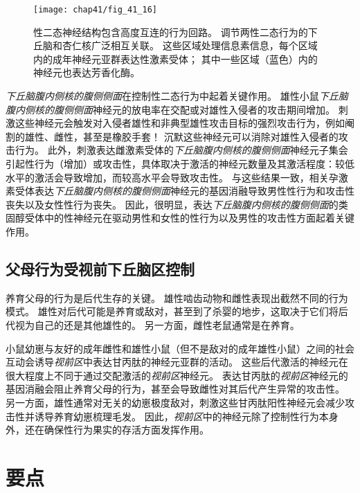 \begin{figure}[htbp]
	\centering
	\texttt{[image: chap41/fig\_41\_16]}
	\caption{性二态神经结构包含高度互连的行为回路。
		调节两性二态行为的下丘脑和杏仁核广泛相互关联。
		这些区域处理信息素信息，每个区域内的成年神经元亚群表达性激素受体；
		其中一些区域（蓝色）内的神经元也表达芳香化酶。}
	\label{fig:41_16}
\end{figure}


\textit{下丘脑腹内侧核的腹侧侧面}在控制性二态行为中起着关键作用。
雄性小鼠\textit{下丘脑腹内侧核的腹侧侧面}神经元的放电率在交配或对雄性入侵者的攻击期间增加。
刺激这些神经元会触发对入侵者雄性和非典型雄性攻击目标的强烈攻击行为，例如阉割的雄性、雌性，甚至是橡胶手套！
沉默这些神经元可以消除对雄性入侵者的攻击行为。
此外，刺激表达雌激素受体的\textit{下丘脑腹内侧核的腹侧侧面}神经元子集会引起性行为（增加）或攻击性，具体取决于激活的神经元数量及其激活程度：较低水平的激活会导致增加，而较高水平会导致攻击性。
与这些结果一致，相关孕激素受体表达\textit{下丘脑腹内侧核的腹侧侧面}神经元的基因消融导致男性性行为和攻击性丧失以及女性性行为丧失。
因此，很明显，表达\textit{下丘脑腹内侧核的腹侧侧面}的类固醇受体中的性神经元在驱动男性和女性的性行为以及男性的攻击性方面起着关键作用。



\subsection{父母行为受视前下丘脑区控制}

养育父母的行为是后代生存的关键。
雄性啮齿动物和雌性表现出截然不同的行为模式。
雄性对后代可能是养育或敌对，甚至到了杀婴的地步，这取决于它们将后代视为自己的还是其他雄性的。
另一方面，雌性老鼠通常是在养育。


小鼠幼崽与友好的成年雌性和雄性小鼠（但不是敌对的成年雄性小鼠）之间的社会互动会诱导\textit{视前区}中表达甘丙肽的神经元亚群的活动。
这些后代激活的神经元在很大程度上不同于通过交配激活的\textit{视前区}神经元。
表达甘丙肽的\textit{视前区}神经元的基因消融会阻止养育父母的行为，甚至会导致雌性对其后代产生异常的攻击性。
另一方面，雄性通常对无关的幼崽极度敌对，刺激这些甘丙肽阳性神经元会减少攻击性并诱导养育幼崽梳理毛发。
因此，\textit{视前区}中的神经元除了控制性行为本身外，还在确保性行为果实的存活方面发挥作用。



\section{要点}


